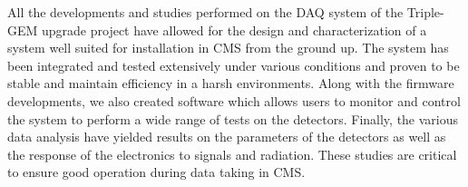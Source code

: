   All the developments and studies performed on the DAQ system of the Triple-GEM upgrade project have allowed for the design and characterization of a system well suited for installation in CMS from the ground up. The system has been integrated and tested extensively under various conditions and proven to be stable and maintain efficiency in a harsh environments. Along with the firmware developments, we also created software which allows users to monitor and control the system to perform a wide range of tests on the detectors. Finally, the various data analysis have yielded results on the parameters of the detectors as well as the response of the electronics to signals and radiation. These studies are critical to ensure good operation during data taking in CMS.
